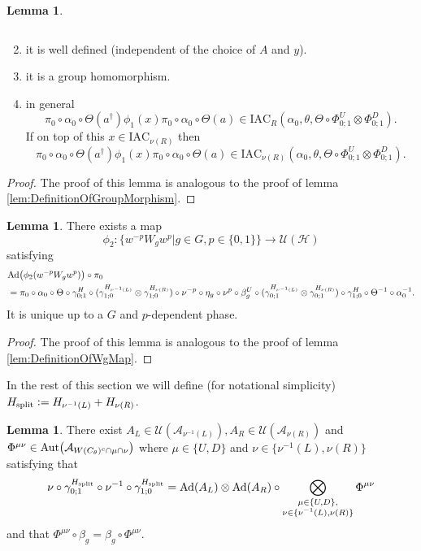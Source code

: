 \documentclass[12pt,a4paper,twoside]{article}
\newcommand{\IAC}{\textrm{IAC}}
\newcommand{\defeq}{\vcentcolon=}
\let\originalleft\left
\let\originalright\right
\renewcommand{\left}{\mathopen{}\mathclose\bgroup\originalleft}
\renewcommand{\right}{\aftergroup\egroup\originalright}
\newcommand{\UU}{\mathcal U}
\newcommand{\HH}{\mathcal H}
\renewcommand{\AA}{\mathcal A}
\newcommand{\Ad}[1]{\textrm{Ad}\left(#1\right)}
\newcommand{\Aut}[1]{\textrm{Aut}\left(#1\right)}
\theoremstyle{definition}
\newtheorem{lemma}[theorem]{Lemma}
\numberwithin{equation}{section}
\begin{document}
\begin{lemma}
\begin{enumerate}
\begin{equation}
		\end{equation}
		\item it is well defined (independent of the choice of $A$ and $y$).
		\item it is a group homomorphism.
		\item in general
			\begin{equation}
				\pi_0\circ\alpha_0\circ\Theta(a^\dagger)\phi_1(x)\pi_0\circ\alpha_0\circ\Theta(a)\in\IAC_R(\alpha_0,\theta,\Theta\circ \Phi^U_{0;1}\otimes\Phi^D_{0;1}).
			\end{equation}
			If on top of this $x\in\IAC_{\nu(R)}$ then
			\begin{equation}
				\pi_0\circ\alpha_0\circ\Theta(a^\dagger)\phi_1(x)\pi_0\circ\alpha_0\circ\Theta(a)\in\IAC_{\nu(R)}(\alpha_0,\theta,\Theta\circ \Phi^U_{0;1}\otimes\Phi^D_{0;1}).
			\end{equation}
	\end{enumerate}
\end{lemma}
\begin{proof}
	The proof of this lemma is analogous to the proof of lemma \ref{lem:DefinitionOfGroupMorphism}.
\end{proof}
\begin{lemma}\label{lem:DefinitionOfWgMapTwoTranslations}
	There exists a map
	\begin{equation}
		\phi_2:\{w^{-p}W_gw^p|g\in G,p\in\{0,1\}\}\rightarrow \UU(\HH)
	\end{equation}
	satisfying
	\begin{align}\label{eq:lemDefinitionOfWgMapConditionTwoTranslations}
		&\Ad{\phi_2(w^{-p}W_gw^p)}\circ\pi_0\\
		\nonumber
		&=\pi_0\circ \alpha_0\circ\Theta\circ\gamma^{H}_{0;1}\circ(\gamma^{H_{\nu^{-1}(L)}}_{1;0}\otimes\gamma^{H_{\nu(R)}}_{1;0})\circ\nu^{-p}\circ\eta_g\circ\nu^p\circ\beta_g^U\circ(\gamma^{H_{\nu^{-1}(L)}}_{0;1}\otimes\gamma^{H_{\nu(R)}}_{0;1})\circ\gamma^{H}_{1;0}\circ\Theta^{-1}\circ\alpha_0^{-1}.
	\end{align}
	It is unique up to a $G$ and $p$-dependent phase.
\end{lemma}
\begin{proof}
	The proof of this lemma is analogous to the proof of lemma \ref{lem:DefinitionOfWgMap}.
\end{proof}
In the rest of this section we will define (for notational simplicity) $H_{\text{split}}\defeq H_{\nu^{-1}(L)}+H_{\nu(R)}$.
\begin{lemma}
	There exist $A_L\in\UU(\AA_{\nu^{-1}(L)}),A_R\in\UU(\AA_{\nu(R)})$ and $\Phi^{\mu\nu}\in\Aut{\AA_{W(C_\theta)^c\cap\mu\cap\nu}}$ where $\mu\in\{U,D\}$ and $\nu\in\{\nu^{-1}(L),\nu(R)\}$ satisfying that
	\begin{equation}\label{eq:TranslatingSplittedTimeEvolution}
		\nu\circ\gamma^{H_{\text{split}}}_{0;1}\circ\nu^{-1}\circ\gamma^{H_{\text{split}}}_{1;0}=\Ad{A_L}\otimes\Ad{A_R}\circ\bigotimes_{\substack{\mu\in\{U,D\},\\\nu\in\{\nu^{-1}(L),\nu(R)\}}}\Phi^{\mu\nu}
	\end{equation}
	and that $\Phi^{\mu\nu}\circ\beta_g=\beta_g\circ\Phi^{\mu\nu}$.
\end{lemma}
\end{document}
